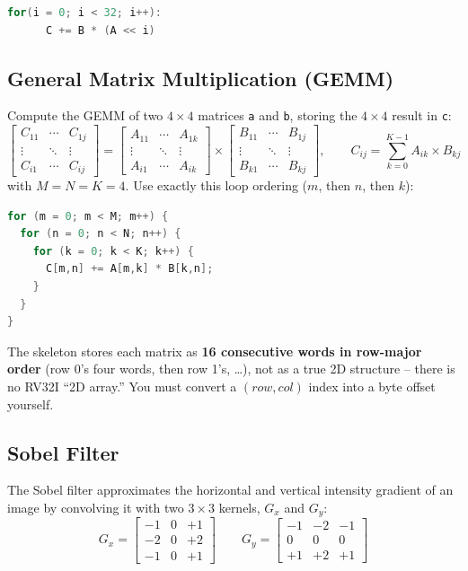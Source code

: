 \documentclass[11pt]{article}
\begin{document}
\begin{worked}
\begin{lstlisting}[language=C]
for(i = 0; i < 32; i++):
      C += B * (A << i)
\end{lstlisting}
\end{worked}

\newpage

\subsection{General Matrix Multiplication (GEMM)}
Compute the GEMM of two $4\times4$ matrices \texttt{a} and \texttt{b},
storing the $4\times4$ result in \texttt{c}:
\[
\begin{bmatrix} C_{11} & \cdots & C_{1j} \\ \vdots & \ddots & \vdots \\ C_{i1} & \cdots & C_{ij} \end{bmatrix}
=
\begin{bmatrix} A_{11} & \cdots & A_{1k} \\ \vdots & \ddots & \vdots \\ A_{i1} & \cdots & A_{ik} \end{bmatrix}
\times
\begin{bmatrix} B_{11} & \cdots & B_{1j} \\ \vdots & \ddots & \vdots \\ B_{k1} & \cdots & B_{kj} \end{bmatrix},
\qquad
C_{ij} = \sum_{k=0}^{K-1} A_{ik} \times B_{kj}
\]
with $M{=}N{=}K{=}4$. Use exactly this loop ordering ($m$, then $n$, then
$k$):

\begin{worked}
\begin{lstlisting}[language=C]
for (m = 0; m < M; m++) {
  for (n = 0; n < N; n++) {
    for (k = 0; k < K; k++) {
      C[m,n] += A[m,k] * B[k,n];
    }
  }
}
\end{lstlisting}
\end{worked}

The skeleton stores each matrix as \textbf{16 consecutive words in
row-major order} (row 0's four words, then row 1's, \ldots), not as a true
2D structure -- there is no RV32I ``2D array.'' You must convert a $(row,
col)$ index into a byte offset yourself.

\newpage

\subsection{Sobel Filter}
The Sobel filter approximates the horizontal and vertical intensity
gradient of an image by convolving it with two $3\times3$ kernels,
$G_x$ and $G_y$:
\[
G_x = \begin{bmatrix} -1 & 0 & +1 \\ -2 & 0 & +2 \\ -1 & 0 & +1 \end{bmatrix}
\qquad
G_y = \begin{bmatrix} -1 & -2 & -1 \\ 0 & 0 & 0 \\ +1 & +2 & +1 \end{bmatrix}
\]
\end{document}
